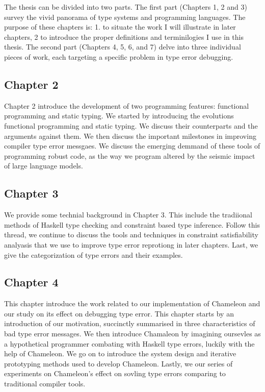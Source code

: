 The thesis can be divided into two parts. The first part (Chapters 1, 2 and 3) survey the vivid panorama of type systems and programming languages. The purpose of these chapters is: 1. to situate the work I will illustrate in later chapters, 2 to introduce the proper definitions and terminilogies I use in this thesis.  The second part (Chapters 4, 5, 6, and 7) delve into three individual pieces of work, each targeting a specific problem in type error debugging.


\subsection{Chapter 2}

Chapter 2 introduce the development of two programming features: functional programming and static typing. We started by introducing the evolutions functional programming and static typing. We discuss their counterparts and the arguments against them. We then discuss the important milestones in improving compiler type error messgaes. We discuss the emerging demmand of these tools of programming robust code, as the way we program altered by the seismic impact of large language models.  


\subsection{Chapter 3}
We provide some technial background in Chapter 3. This include the tradiional methods of Haskell type checking and constraint based type inference. Follow this thread, we continue to discuss the tools and techniques in constraint satisfiability analyasis that we use to improve type error reprotiong in later chapters. Last, we give the categorization of type errors and their examples. 

\subsection{Chapter 4}
This chapter introduce the work related to our implementation of Chameleon and our study on its effect on debugging type error. This chapter starts by an introduction of our motivation, succinctly summarised in three characteristics of bad type error messages. We then introduce Chamaleon by imagining oursevles as a hypothetical programmer combating with Haskell type errors, luckily with the help of Chameleon. We go on to introduce the system design and iterative prototyping methods used to develop Chameleon. Lastly, we our series of experiments on Chameleon's effect on sovling type errors comparing to traditional compiler tools. 


